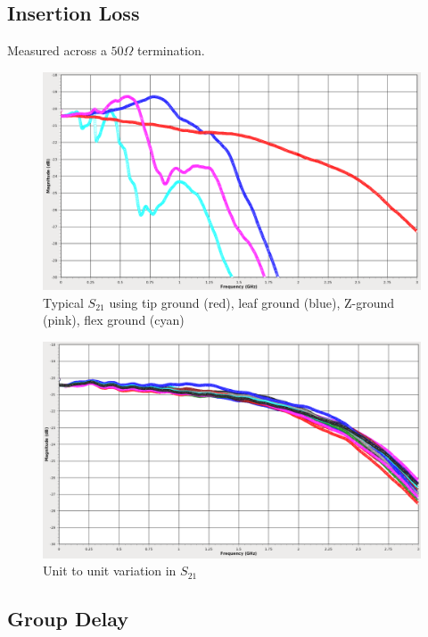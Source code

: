 \documentclass[11pt]{article}
\begin{document}
\subsection{Insertion Loss}

Measured across a $50 \Omega$ termination.

\begin{figure}[h]
\centering
\includegraphics[width=14cm]{typical-s21.png}
\caption{Typical $S_{21}$ using tip ground (red), leaf ground (blue), Z-ground (pink), flex ground (cyan)}
\end{figure}

\begin{figure}[h]
\centering
\includegraphics[width=14cm]{s21-spread.png}
\caption{Unit to unit variation in $S_{21}$}
\end{figure}

\pagebreak
\subsection{Group Delay}
\end{document}
